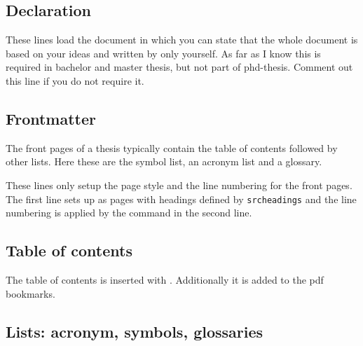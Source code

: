 \subsection{Declaration}
\label{sec:document:declaration}

These lines load the document  in which you can state that the whole document is based on your ideas and written by only yourself. As far as I know this is required in bachelor and master thesis, but not part of phd-thesis. Comment out this line if you do not require it.

\subsection{Frontmatter}
\label{sec:document:frontmatter}

The front pages of a thesis typically contain the table of contents followed by other lists. Here these are the symbol list, an acronym list and a glossary.

These lines only setup the page style and the line numbering for the front pages. The first line sets up as pages with headings defined by \texttt{srcheadings} and the line numbering is applied by the command  in the second line.

\subsection{Table of contents}
\label{sec:document:toc}

The table of contents is inserted with . Additionally it is added to the pdf bookmarks.

\subsection{Lists: acronym, symbols, glossaries}
\label{sec:document:glossaries}

